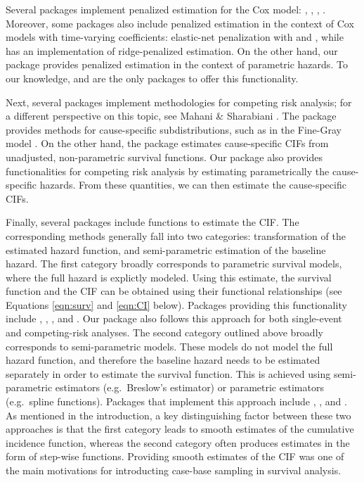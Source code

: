 \documentclass[
]{jss}
\begin{document}
Several packages implement penalized estimation for the Cox model:
 \citeyearpar{regpathcox}, 
\citeyearpar{park_hastie},  \citeyearpar{l1penal},
 \citeyearpar{gerds_blanche}. Moreover, some
packages also include penalized estimation in the context of Cox models
with time-varying coefficients: elastic-net penalization with
 \citeyearpar{perperoglou} and 
\citeyearpar{clements_liu}, while 
\citeyearpar{survival-package} has an implementation of ridge-penalized
estimation. On the other hand, our package  provides
penalized estimation in the context of parametric hazards. To our
knowledge,  and  are the only packages to
offer this functionality.

Next, several  packages implement methodologies for
competing risk analysis; for a different perspective on this topic, see
Mahani \& Sharabiani \citeyearpar{mahani2015bayesian}. The package
 provides methods for cause-specific subdistributions, such
as in the Fine-Gray model \citeyearpar{fine1999proportional}. On the
other hand, the package  estimates cause-specific CIFs from
unadjusted, non-parametric survival functions. Our package
 also provides functionalities for competing risk analysis
by estimating parametrically the cause-specific hazards. From these
quantities, we can then estimate the cause-specific CIFs.

Finally, several packages include functions to estimate the CIF. The
corresponding methods generally fall into two categories: transformation
of the estimated hazard function, and semi-parametric estimation of the
baseline hazard. The first category broadly corresponds to parametric
survival models, where the full hazard is explictly modeled. Using this
estimate, the survival function and the CIF can be obtained using their
functional relationships (see Equations \ref{eqn:surv} and \ref{eqn:CI}
below). Packages providing this functionality include ,
, , and . Our package
 also follows this approach for both single-event and
competing-risk analyses. The second category outlined above broadly
corresponds to semi-parametric models. These models do not model the
full hazard function, and therefore the baseline hazard needs to be
estimated separately in order to estimate the survival function. This is
achieved using semi-parametric estimators (e.g.~Breslow's estimator) or
parametric estimators (e.g.~spline functions). Packages that implement
this approach include , , and
. As mentioned in the introduction, a key distinguishing
factor between these two approaches is that the first category leads to
smooth estimates of the cumulative incidence function, whereas the
second category often produces estimates in the form of step-wise
functions. Providing smooth estimates of the CIF was one of the main
motivations for introducting case-base sampling in survival analysis.
\end{document}
